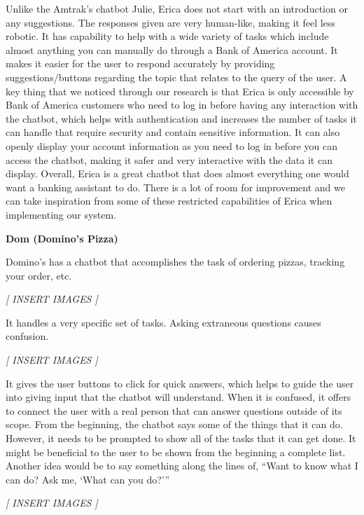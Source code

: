 \documentclass[titlepage, 12pt]{article}
\begin{document}
Unlike the Amtrak’s chatbot Julie, Erica does not start with an introduction or any suggestions. The responses given are very human-like, making it feel less robotic. It has capability to help with a wide variety of tasks which include almost anything you can manually do through a Bank of America account. It makes it easier for the user to respond accurately by providing suggestions/buttons regarding the topic that relates to the query of the user. A key thing that we noticed through our research is that Erica is only accessible by Bank of America customers who need to log in before having any interaction with the chatbot, which helps with authentication and increases the number of tasks it can handle that require security and contain sensitive information. It can also openly display your account information as you need to log in before you can access the chatbot, making it safer and very interactive with the data it can display. Overall, Erica is a great chatbot that does almost everything one would want a banking assistant to do. There is a lot of room for improvement and we can take inspiration from some of these restricted capabilities of Erica when implementing our system.

\textbf{Dom (Domino's Pizza)}

Domino’s has a chatbot that accomplishes the task of ordering pizzas, tracking your order, etc.  

\begin{center}\emph{[ INSERT IMAGES ]}\end{center}

It handles a very specific set of tasks. Asking extraneous questions causes confusion.

\begin{center}\emph{[ INSERT IMAGES ]}\end{center}

It gives the user buttons to click for quick answers, which helps to guide the user into giving input that the chatbot will understand. When it is confused, it offers to connect the user with a real person that can answer questions outside of its scope. From the beginning, the chatbot says some of the things that it can do. However, it needs to be prompted to show all of the tasks that it can get done. It might be beneficial to the user to be shown from the beginning a complete list. Another idea would be to say something along the lines of, “Want to know what I can do? Ask me, ‘What can you do?’”

\begin{center}\emph{[ INSERT IMAGES ]}\end{center}
\end{document}
